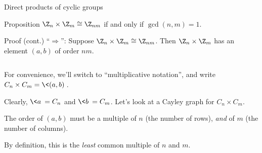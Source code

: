 \documentclass[8pt, handout]{beamer}
\newcommand{\Pause}{}
\begin{document}
\begin{frame}{Direct products of cyclic groups} \smallskip
  
  \begin{block}{Proposition}
    $\Z_n\times\Z_m\cong\Z_{nm}$ if and only if $\gcd(n,m)=1$.
  \end{block}
  
  \smallskip
  
  \begin{exampleblock}{Proof (cont.)}
    ``$\Rightarrow$'': Suppose $\Z_n\times\Z_m\cong\Z_{nm}$. \Pause Then
    $\Z_n\times\Z_m$ has an element $(a,b)$ of order $nm$.
    
    \medskip\Pause
    
    \begin{columns}
      \begin{column}{.55\textwidth}
        For convenience, we'll switch to ``multiplicative
        notation'', and write $C_n\times C_m=\<(a,b)\>$.
        
        \Pause\medskip
        
        Clearly, $\<a\>=C_n$ and $\<b\>=C_m$. \Pause Let's look at a
        Cayley graph for $C_n\times C_m$.
        
        \Pause\medskip
        
        The order of $(a,b)$ must be a multiple of $n$ (the number of
        rows), \emph{and} of $m$ (the number of columns). 
        
        \Pause\medskip
        
        By definition, this is the \emph{least} common multiple of $n$ and
        $m$.
      \end{column}
      

\end{columns}
\end{exampleblock}
\end{frame}
\end{document}
